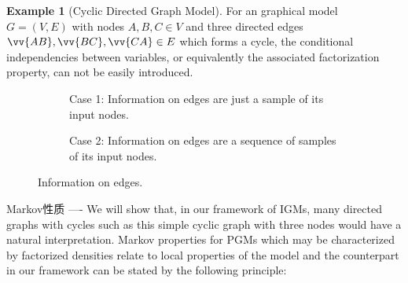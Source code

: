 \documentclass{article}
\theoremstyle{definition}
\theoremstyle{remark}
\theoremstyle{definition}
\newtheorem{example}{Example}[section]
\begin{document}
\begin{CJK*}{UTF8}{gbsn}
\begin{example}[Cyclic Directed Graph Model]
\label{eg:cycleDG}
For an graphical model $G=(V, E)$ with nodes $A, B, C \in V$ and three directed edges $\vv{AB}, \vv{BC}, \vv{CA} \in E$ which forms a cycle, the conditional independencies between variables, or equivalently the associated factorization property, can not be easily introduced.   


\begin{figure}[h]
	\begin{subfigure}[tb]{0.45\textwidth}
		\centering
		\caption{Case 1: Information on edges are just a sample of its input nodes.}
		\label{fig:onesample}
	\end{subfigure}
    \hfill
	\begin{subfigure}[tb]{0.45\textwidth}
		\centering
		\caption{Case 2: Information on edges are a sequence of samples of its input nodes.}
		\label{fig:manysamples}
	\end{subfigure}\caption{Information on edges.}
\end{figure}

\end{example}

Markov性质 ----
We will show that, in our framework of IGMs, many directed graphs with cycles such as this simple cyclic graph with three nodes would have a natural interpretation. Markov properties for PGMs which may be characterized by factorized densities relate to local properties of the model and the counterpart in our framework can be stated by the following principle:


\end{CJK*}
\end{document}
